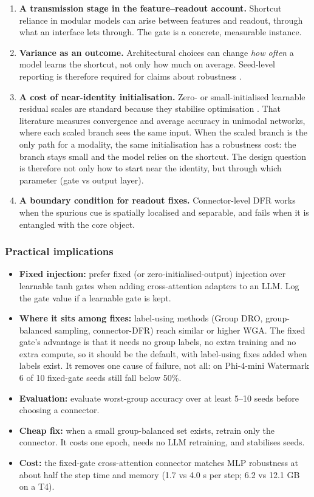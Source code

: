 \begin{enumerate}
\def\labelenumi{\arabic{enumi}.}
\item
  \textbf{A transmission stage in the feature--readout account.} Shortcut reliance in modular models can arise
  between features and readout, through what an interface lets through. The gate is a concrete, measurable
  instance.
\item
  \textbf{Variance as an outcome.} Architectural choices can change \emph{how often} a model learns the shortcut, not
  only how much on average. Seed-level reporting is therefore required for claims about robustness
  \cite{bouthillier2021variance}.
\item
  \textbf{A cost of near-identity initialisation.} Zero- or small-initialised learnable residual scales are
  standard because they stabilise optimisation \cite{bachlechner2021rezero,de2020skipinit,touvron2021cait}.
  That literature measures convergence and average accuracy in unimodal networks, where each scaled branch
  sees the same input. When the scaled branch is the only path for a modality, the same initialisation has a
  robustness cost: the branch stays small and the model relies on the shortcut. The design question is
  therefore not only how to start near the identity, but through which parameter (gate vs output layer).
\item
  \textbf{A boundary condition for readout fixes.} Connector-level DFR works when the spurious cue is spatially
  localised and separable, and fails when it is entangled with the core object.
\end{enumerate}

\subsubsection{Practical implications}

\begin{itemize}
\item
  \textbf{Fixed injection:} prefer fixed (or zero-initialised-output) injection over learnable tanh gates when
  adding cross-attention adapters to an LLM. Log the gate value if a learnable gate is kept.
\item
  \textbf{Where it sits among fixes:} label-using methods (Group DRO, group-balanced sampling, connector-DFR) reach
  similar or higher WGA. The fixed gate's advantage is that it needs no group labels, no extra training and no
  extra compute, so it should be the default, with label-using fixes added when labels exist. It removes
  one cause of failure, not all: on Phi-4-mini Watermark 6 of 10 fixed-gate seeds still fall below 50\%.
\item
  \textbf{Evaluation:} evaluate worst-group accuracy over at least 5--10 seeds before choosing a connector.
\item
  \textbf{Cheap fix:} when a small group-balanced set exists, retrain only the connector. It costs one epoch, needs
  no LLM retraining, and stabilises seeds.
\item
  \textbf{Cost:} the fixed-gate cross-attention connector matches MLP robustness at about half the step time and
  memory (1.7 vs 4.0 s per step; 6.2 vs 12.1 GB on a T4).
\end{itemize}

